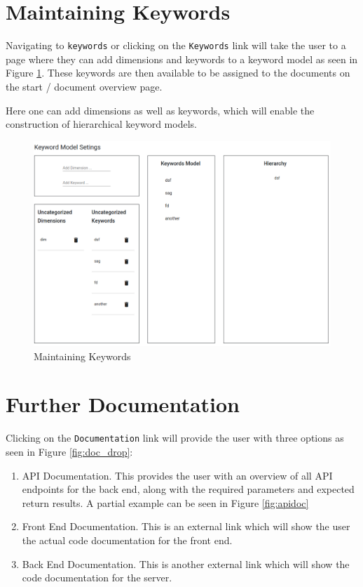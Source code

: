 \documentclass{article}
\begin{document}
\section{Maintaining Keywords}
Navigating to \verb|keywords| or clicking on the \verb|Keywords| link will take the user to a page where they can add dimensions and keywords to a keyword model as seen in Figure \ref{fig:key1}. These keywords are then available to be assigned to the documents on the start / document overview page.

Here one can add dimensions as well as keywords, which will enable the construction of hierarchical keyword models.

\begin{figure}
    \centering
    \includegraphics[scale=0.4]{img/key1.png}
    \caption{Maintaining Keywords}
    \label{fig:key1}
\end{figure}

\section{Further Documentation}
Clicking on the \verb|Documentation| link will provide the user with three options as seen in Figure \ref{fig:doc_drop}:

\begin{enumerate}
    \item API Documentation. This provides the user with an overview of all API endpoints for the back end, along with the required parameters and expected return results. A partial example can be seen in Figure \ref{fig:apidoc}
    \item Front End Documentation. This is an external link which will show the user the actual code documentation for the front end.
    \item Back End Documentation. This is another external link which will show the code documentation for the server.
\end{enumerate}
\end{document}
